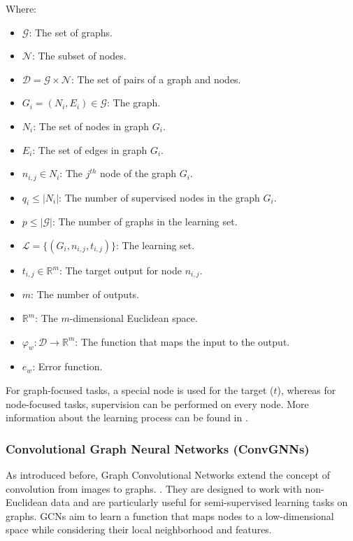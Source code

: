     Where:
    \begin{itemize}
        \item \( \mathcal{G} \): The set of graphs.
        \item \( \mathcal{N} \): The subset of nodes.
        \item \( \mathcal{D} = \mathcal{G} \times \mathcal{N} \): The set of pairs of a graph and nodes.
        \item \( G_{i} = (N_{i},E_{i}) \in \mathcal{G} \): The graph.
        \item \( N_{i} \): The set of nodes in graph \( G_{i} \).
        \item \( E_{i} \): The set of edges in graph \( G_{i} \).
        \item \( n_{i,j} \in N_{i} \): The \( j^{th} \) node of the graph \( G_{i} \).
        \item \( q_{i} \leq |N_{i}| \): The number of supervised nodes in the graph \( G_{i} \).
        \item \( p \leq |\mathcal{G}| \): The number of graphs in the learning set.
        \item \( \mathcal{L} = \{(G_{i},n_{i,j},t_{i,j})\} \): The learning set.
        \item \( t_{i,j} \in \mathbb{R}^m \): The target output for node \( n_{i,j} \).
        \item \( m \): The number of outputs.
        \item \( \mathbb{R}^m \): The \( m \)-dimensional Euclidean space.
        \item \( \varphi_{w} : \mathcal{D} \to \mathbb{R}^m \): The function that maps the input to the output.
        \item \( e_{w} \): Error function.
    \end{itemize}

    For graph-focused tasks, a special node is used for the target (\( t \)), whereas for node-focused tasks, supervision can be performed on every node. More information about the learning process can be found in \cite{GNN08}.

    \subsubsection{Convolutional Graph Neural Networks (ConvGNNs)}
    As introduced before, Graph Convolutional Networks extend the concept of convolution from images to graphs.  \cite{KG22}. They are designed to work with non-Euclidean data and are particularly useful for semi-supervised learning tasks on graphs. GCNs aim to learn a function that maps nodes to a low-dimensional space while considering their local neighborhood and features.

